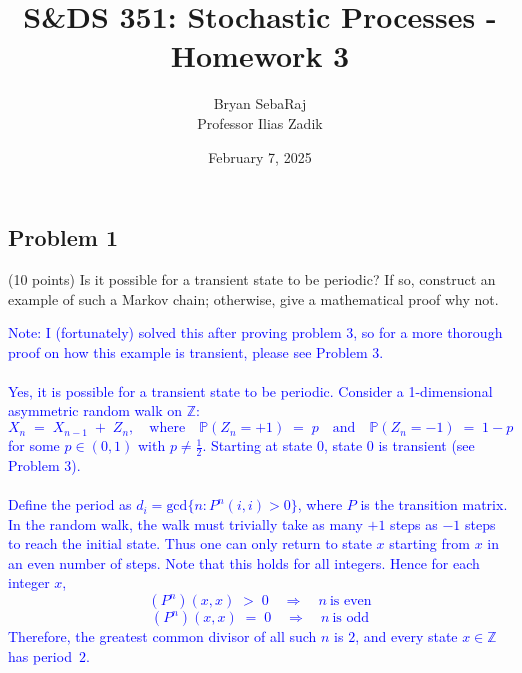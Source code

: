 \documentclass{article}
\title{S\&DS 351: Stochastic Processes - Homework 3}
\author{Bryan SebaRaj \\[0.8em] Professor Ilias Zadik}
\date{February 7, 2025}
\begin{document}
\maketitle

\subsection*{Problem 1} (10 points) Is it possible for a transient state to be periodic? If so, construct an example of such a Markov chain; otherwise, give a mathematical proof why not.

\textcolor{blue}{Note: I (fortunately) solved this after proving problem 3, so for a more thorough proof on how this example is transient, please see Problem 3. \\ \\ 
Yes, it is possible for a transient state to be periodic. Consider a 1-dimensional asymmetric random walk on $\mathbb{Z}$:
\[
   X_{n} \;=\; X_{n-1} \;+\; Z_n,
   \quad\text{where}\quad
   \mathbb{P}(Z_n = +1) \;=\; p
   \quad\text{and}\quad
   \mathbb{P}(Z_n = -1) \;=\; 1 - p
\]
for some $p \in (0,1)$ with $p \neq \tfrac{1}{2}$. Starting at state 0, state 0 is transient (see Problem 3). \\ \\ 
\smallskip
\noindent
Define the period as $d_i = \text{gcd}\{n:P^n(i,i)>0\}$, where $P$ is the transition matrix. \\
In the random walk, the walk must trivially take as many $+1$ steps as $-1$ steps to reach the initial state. Thus one can only return to state $x$ starting from $x$ in an even number of steps. Note that this holds for all integers. Hence for each integer $x$, 
\[
  (P^n)(x,x) \;>\;0 
  \quad\Longrightarrow\quad 
  n \ \text{is even}
\]
\[
  (P^n)(x,x) \;=\;0 
  \quad\Longrightarrow\quad 
  n \ \text{is odd}
\]
Therefore, the greatest common divisor of all such $n$ is $2$, and every state $x\in\mathbb{Z}$ has period~$2$.
}
   
\end{document}
